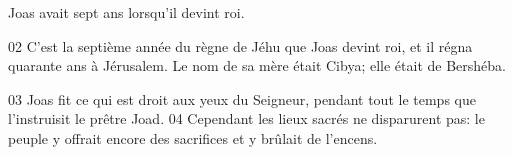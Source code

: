 Joas avait sept ans lorsqu’il devint roi.

02 C’est la septième année du règne de Jéhu que Joas devint roi, et il régna quarante ans à Jérusalem. Le nom de sa mère était Cibya; elle était de Bershéba.

03 Joas fit ce qui est droit aux yeux du Seigneur, pendant tout le temps que l’instruisit le prêtre Joad.
04 Cependant les lieux sacrés ne disparurent pas: le peuple y offrait encore des sacrifices et y brûlait de l’encens.
